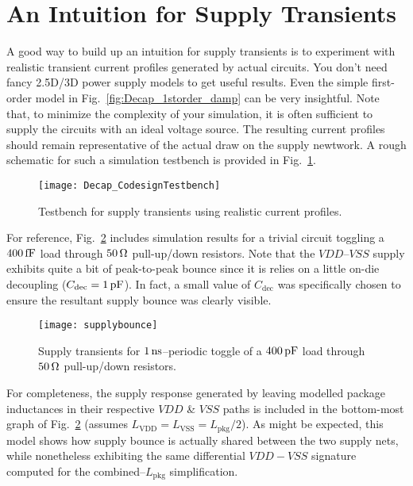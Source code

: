 \section{An Intuition for Supply Transients}
\par A good way to build up an intuition for supply transients is to experiment
with realistic transient current profiles generated by actual circuits. You
don't need fancy 2.5D/3D power supply models to get useful results. Even the
simple first-order model in Fig.~\ref{fig:Decap_1storder_damp} can be very
insightful.  Note that, to minimize the complexity of your simulation, it
is often sufficient to supply the circuits with an ideal voltage source. The
resulting current profiles should remain representative of the actual draw on
the supply newtwork. A rough schematic for such a simulation testbench is
provided in Fig.~\ref{fig:Testbench_SupplyTransient}.
%
\begin{figure}[!ht]
	\centering
	\texttt{[image: Decap\_CodesignTestbench]}
	\caption{Testbench for supply transients using realistic current profiles.}
\label{fig:Testbench_SupplyTransient}%
\end{figure}
%
\par For reference, Fig.~\ref{fig:Supplybounce} includes simulation results for
a trivial circuit toggling a $400\mathrm{\,fF}$ load through $50\mathrm{\,\Omega}$ pull-up/down
resistors. Note that the $VDD$--$VSS$ supply exhibits quite a bit of
peak-to-peak bounce since it is relies on a little on-die decoupling
($C_\mathrm{dec}=1\mathrm{\,pF}$). In fact, a small value of $C_\mathrm{dec}$ was
specifically chosen to ensure the resultant supply bounce was clearly visible.
%
\begin{figure}[!ht]
	\centering
	\texttt{[image: supplybounce]}
	\caption{Supply transients for $1\mathrm{\,ns}$--periodic toggle of a $400\mathrm{\,pF}$ load through $50\mathrm{\,\Omega}$ pull-up/down resistors.}
\label{fig:Supplybounce}%
\end{figure}
%
\par For completeness, the supply response generated by leaving modelled
package inductances in their respective $VDD$ \& $VSS$ paths is included in the
bottom-most graph of Fig.~\ref{fig:Supplybounce} (assumes
$L_\mathrm{VDD}=L_\mathrm{VSS}=L_\mathrm{pkg}/2$). As might be expected, this
model shows how supply bounce is actually shared between the two supply nets,
while nonetheless exhibiting the same differential $VDD-VSS$ signature
computed for the combined--$L_\mathrm{pkg}$ simplification.
%
